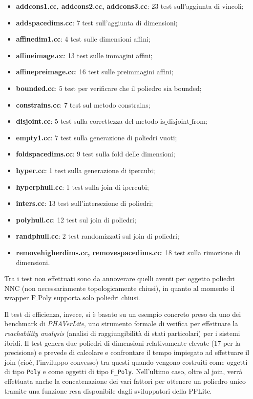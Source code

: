 \documentclass[italian]{mimosis}
\theoremstyle{definition}
\begin{document}
\begin{itemize}
\item \textbf{addcons1.cc, addcons2.cc, addcons3.cc}: 23 test sull'aggiunta di vincoli;
\item \textbf{addspacedims.cc}: 7 test sull'aggiunta di dimensioni;
\item \textbf{affinedim1.cc}: 4 test sulle dimensioni affini;
\item \textbf{affineimage.cc}: 13 test sulle immagini affini;
\item \textbf{affinepreimage.cc}: 16 test sulle preimmagini affini;
\item \textbf{bounded.cc}: 5 test per verificare che il poliedro sia bounded;
\item \textbf{constrains.cc}: 7 test sul metodo constrains;
\item \textbf{disjoint.cc}: 5 test sulla correttezza del metodo \(\text{is\_disjoint\_from}\);
\item \textbf{empty1.cc}: 7 test sulla generazione di poliedri vuoti;
\item \textbf{foldspacedims.cc}: 9 test sulla fold delle dimensioni;
\item \textbf{hyper.cc}: 1 test sulla generazione di ipercubi;
\item \textbf{hyperphull.cc}: 1 test sulla join di ipercubi;
\item \textbf{inters.cc}: 13 test sull'intersezione di poliedri;
\item \textbf{polyhull.cc}: 12 test sul join di poliedri;
\item \textbf{randphull.cc}: 2 test randomizzati sul join di poliedri;
\item \textbf{removehigherdims.cc, removespacedims.cc}: 18 test sulla rimozione di
dimensioni.
\end{itemize}

Tra i test non effettuati sono da annoverare quelli aventi per oggetto poliedri
NNC (non necessariamente topologicamente chiusi), in quanto al momento il
wrapper \(\text{F\_Poly}\) supporta solo poliedri chiusi.

Il test di efficienza, invece, si è basato su un esempio concreto preso da uno
dei benchmark di \emph{PHAVerLite}, uno strumento formale
di verifica per effettuare la \emph{reachability analysis} (analisi di
raggiungibilità di stati particolari) per i sistemi ibridi.
Il test genera due poliedri di dimensioni relativamente elevate
(17 per la precisione) e prevede di calcolare e confrontare il tempo impiegato ad effettuare
il join (cioè, l'inviluppo convesso) tra questi quando vengono costruiti come oggetti di tipo \texttt{Poly} e
come oggetti di tipo \texttt{F\_Poly}. Nell'ultimo caso, oltre al join, verrà effettuata
anche la concatenazione dei vari fattori per ottenere un poliedro unico tramite una
funzione resa disponibile dagli sviluppatori della PPLite.
\end{document}

